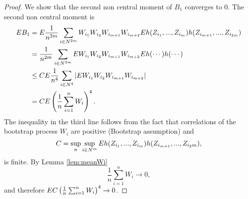 \begin{proof}
 We  show that the second non central moment of $B_1$ converges to $0$. The second non central moment is 
\begin{align*}
 E B_1 &= E \frac {1} {n^{2m}} \sum_{i \in N^{2m}}  W_{i_1} W_{i_2}  W_{i_{m+1}} W_{i_{m+2}} E h(Z_{i_1},...,Z_{i_m})  h(Z_{i_{m+1}},...,Z_{i_{2m}})\\
              &=\frac {1} {n^{2m}} \sum_{i \in N^{2m}} E W_{i_1} W_{i_2}  W_{i_{m+1}} W_{i_{m+2}}  E h(\cdots) h(\cdots)   \\
               & \leq  C E  \frac {1}  {n^4} \sum_{i \in N^4}  |E W_{i_1} W_{i_2}  W_{i_{m+1}} W_{i_{m+2}}|\\
              & = C E  \left( \frac {1}  {n}  \sum_{i=1}^n W_i \right)^4.
\end{align*}
The inequality in the third line follows from the fact that correlations of the bootstrap process $W_i$ are positive (Bootstrap assumption) and 
$$C = \sup_{n} \sup_{i \in N^m}E h(Z_{i_1},...,Z_{i_m})  h(Z_{i_{m+1}},...,Z_{i_2m}),$$ 
is finite. By Lemma \ref{lem:meanWi} 
\[
 \frac {1}  {n}  \sum_{i=1}^n W_i  \to 0,
\]
and therefore  $E C \left( \frac {1}  {n}  \sum_{i=1}^n W_i \right)^4 \to 0$.


\end{proof}
